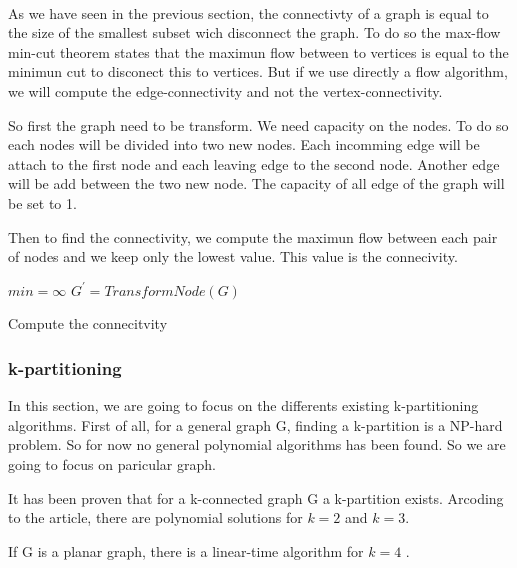 \paragraph{}
As we have seen in the previous section, the connectivty of a graph is equal to the size of the smallest subset wich disconnect the graph.
To do so the max-flow min-cut theorem states that the maximun flow between to vertices is equal to the minimun cut to disconect this to vertices.
But if we use directly a flow algorithm, we will compute the edge-connectivity and not the vertex-connectivity.

So first the graph need to be transform. We need capacity on the nodes. To do so each nodes will be divided into two new nodes. Each incomming edge will be attach to the first node and each leaving edge to the second node. Another edge will be add between the two new node.
The capacity of all edge of the graph will be set to 1.

Then to find the connectivity, we compute the maximun flow between each pair of nodes and we keep only the lowest value. This value is the connecivity.


\begin{algorithm}[!h]
    $min = \infty$\;
    $G^{'} = TransformNode(G)$\;
    \;
    \caption{Compute the connecitvity}
\end{algorithm}

\subsubsection{k-partitioning}
In this section, we are going to focus on the differents existing k-partitioning algorithms.
First of all, for a general graph G, finding a k-partition is a NP-hard problem\cite{Dyer1985139}.
So for now no general polynomial algorithms has been found.
So we are going to focus on paricular graph.

It has been proven that for a k-connected graph G a k-partition exists\cite{GE78,LL77}.
Arcoding to the article, there are polynomial solutions for $k=2$\cite{GE78,LL77} and $k=3$.

If G is a planar graph, there is a linear-time algorithm for $k = 4$ \cite{Nakano1997315}.




